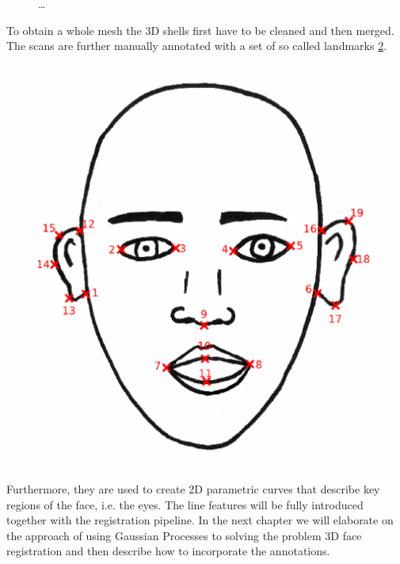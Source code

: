 \begin{figure}[h!]
\caption{\ldots}
\label{fig:scan}
\end{figure}
To obtain a whole mesh the 3D shells first have to be cleaned and then merged.
The scans are further manually annotated with a set of so called landmarks \ref{fig:landmarks}. 
\begin{figure}
    \centering
    \includegraphics[width=.3\textwidth]{./resources/figures/schema_marked.eps}
    \label{fig:landmarks}
\end{figure}
Furthermore, they are used to create 2D parametric curves that describe key regions of the face, i.e. the eyes. The line features will be fully introduced together with the registration pipeline. In the next chapter we will elaborate on the approach of using Gaussian Processes to solving the problem 3D face registration and then describe how to incorporate the annotations.

